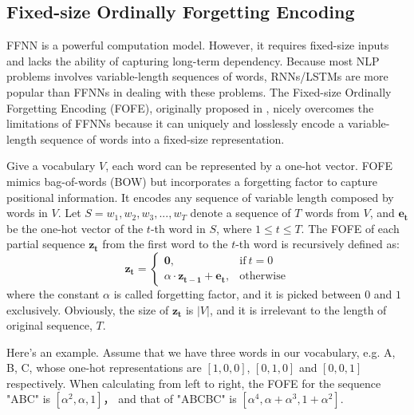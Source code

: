 \documentclass[11pt,a4paper]{article}
\begin{document}
\subsection{Fixed-size Ordinally Forgetting Encoding}

FFNN is a powerful computation model. 
However, it requires fixed-size inputs and 
lacks the ability of capturing long-term dependency. 
Because most NLP problems involves variable-length sequences of words, 
RNNs/LSTMs are more popular than FFNNs in dealing with these problems. 
The Fixed-size Ordinally Forgetting Encoding (FOFE), 
originally proposed in \cite{zhang2015fixed}, nicely overcomes the limitations of FFNNs because it 
can uniquely and losslessly encode a variable-length sequence of words into a fixed-size representation. 

Give a vocabulary $V$, each word can be represented by a one-hot vector. 
FOFE mimics bag-of-words (BOW) but incorporates a forgetting factor to capture positional information.
It encodes any sequence of variable length composed by words in $V$. 
Let $S = {w_1, w_2, w_3, ... , w_T}$ denote a sequence of $T$ words from $V$, 
and $\bm{e_t}$ be the one-hot vector of the $t$-th word in $S$, where $1 \leq t \leq T$.
The FOFE of each partial sequence $\bm{z_t}$ from the first word to the $t$-th word is recursively defined as:
\begin{equation}
\bm{z_t}=
\begin{cases}
\bm{0}, & \text{if}\ t = 0 \\
\alpha \cdot \bm{z_{t - 1}} + \bm{e_t}, & \text{otherwise}
\end{cases}  \label{eq_FOFE_formula}
\end{equation}
where the constant $\alpha$ is called forgetting factor, and it is picked between $0$ and $1$ exclusively. 
Obviously, the size of $\bm{z_t}$ is $|V|$, and it is irrelevant to the length of original sequence, $T$.

Here's an example. Assume that we have three words in our vocabulary, e.g. A, B, C, 
whose one-hot representations are $[1, 0, 0]$, $[0, 1, 0]$ and $[0, 0, 1]$ respectively. 
When calculating from left to right, the FOFE for the sequence 
"ABC" is $[{\alpha}^2, {\alpha}, 1]$， 
and that of 
"ABCBC" is $[{\alpha}^4, {\alpha} + {\alpha}^3, 1 + {\alpha}^2]$.
\end{document}

